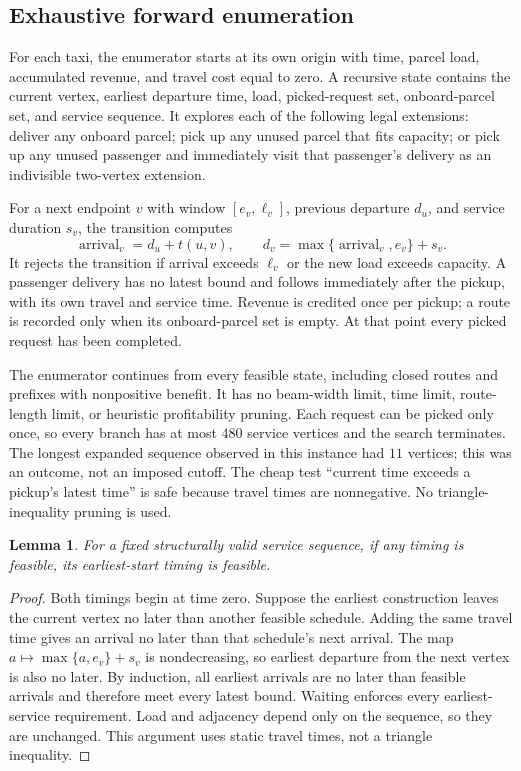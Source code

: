 \documentclass[11pt,a4paper]{article}
\newtheorem{lemma}{Lemma}
\begin{document}
\subsection{Exhaustive forward enumeration}

For each taxi, the enumerator starts at its own origin with time, parcel
load, accumulated revenue, and travel cost equal to zero. A recursive state
contains the current vertex, earliest departure time, load, picked-request
set, onboard-parcel set, and service sequence. It explores each of the
following legal extensions: deliver any onboard parcel; pick up any unused
parcel that fits capacity; or pick up any unused passenger and immediately
visit that passenger's delivery as an indivisible two-vertex extension.

For a next endpoint $v$ with window $[e_v,\ell_v]$, previous departure $d_u$,
and service duration $s_v$, the transition computes
\[
 \operatorname{arrival}_v=d_u+t(u,v),\qquad
 d_v=\max\{\operatorname{arrival}_v,e_v\}+s_v.
\]
It rejects the transition if arrival exceeds $\ell_v$ or the new load exceeds
capacity. A passenger delivery has no latest bound and follows immediately
after the pickup, with its own travel and service time. Revenue is credited
once per pickup; a route is recorded only when its onboard-parcel set is
empty. At that point every picked request has been completed.

The enumerator continues from every feasible state, including closed routes
and prefixes with nonpositive benefit. It has no beam-width limit, time
limit, route-length limit, or heuristic profitability pruning. Each request
can be picked only once, so every branch has at most $480$ service vertices
and the search terminates. The longest expanded sequence observed in this
instance had $11$ vertices; this was an outcome, not an imposed cutoff.
The cheap test ``current time exceeds a pickup's latest time'' is safe because
travel times are nonnegative. No triangle-inequality pruning is used.

\begin{lemma}\label{lem:earliest}
For a fixed structurally valid service sequence, if any timing is feasible,
its earliest-start timing is feasible.
\end{lemma}
\begin{proof}
Both timings begin at time zero. Suppose the earliest construction leaves
the current vertex no later than another feasible schedule. Adding the same
travel time gives an arrival no later than that schedule's next arrival.
The map $a\mapsto\max\{a,e_v\}+s_v$ is nondecreasing, so earliest departure
from the next vertex is also no later. By induction, all earliest arrivals
are no later than feasible arrivals and therefore meet every latest bound.
Waiting enforces every earliest-service requirement. Load and adjacency
depend only on the sequence, so they are unchanged. This argument uses
static travel times, not a triangle inequality.
\end{proof}
\end{document}
